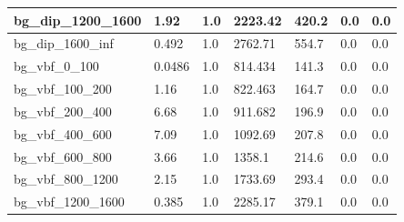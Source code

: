 \documentclass[a4paper, 10pt]{article}
\begin{document}
\begin{table}[H]
\begin{center}
\begin{tabular}{|m{23.0mm}|m{23.0mm}|m{18.0mm}|m{19.0mm}|m{19.0mm}|m{19.0mm}|m{19.0mm}|}
      \hline
      {\cellcolor{white}         bg\_dip\_1200\_1600}& {\cellcolor{white}         1.92}& {\cellcolor{white}         1.0}& {\cellcolor{white}         2223.42}& {\cellcolor{white}         420.2}& {\cellcolor{green}         0.0}& {\cellcolor{green}         0.0}\\
      \hline
      {\cellcolor{white}         bg\_dip\_1600\_inf}& {\cellcolor{white}         0.492}& {\cellcolor{white}         1.0}& {\cellcolor{white}         2762.71}& {\cellcolor{white}         554.7}& {\cellcolor{green}         0.0}& {\cellcolor{green}         0.0}\\
      \hline
      {\cellcolor{white}         bg\_vbf\_0\_100}& {\cellcolor{white}         0.0486}& {\cellcolor{white}         1.0}& {\cellcolor{white}         814.434}& {\cellcolor{white}         141.3}& {\cellcolor{green}         0.0}& {\cellcolor{green}         0.0}\\
      \hline
      {\cellcolor{white}         bg\_vbf\_100\_200}& {\cellcolor{white}         1.16}& {\cellcolor{white}         1.0}& {\cellcolor{white}         822.463}& {\cellcolor{white}         164.7}& {\cellcolor{green}         0.0}& {\cellcolor{green}         0.0}\\
      \hline
      {\cellcolor{white}         bg\_vbf\_200\_400}& {\cellcolor{white}         6.68}& {\cellcolor{white}         1.0}& {\cellcolor{white}         911.682}& {\cellcolor{white}         196.9}& {\cellcolor{green}         0.0}& {\cellcolor{green}         0.0}\\
      \hline
      {\cellcolor{white}         bg\_vbf\_400\_600}& {\cellcolor{white}         7.09}& {\cellcolor{white}         1.0}& {\cellcolor{white}         1092.69}& {\cellcolor{white}         207.8}& {\cellcolor{green}         0.0}& {\cellcolor{green}         0.0}\\
      \hline
      {\cellcolor{white}         bg\_vbf\_600\_800}& {\cellcolor{white}         3.66}& {\cellcolor{white}         1.0}& {\cellcolor{white}         1358.1}& {\cellcolor{white}         214.6}& {\cellcolor{green}         0.0}& {\cellcolor{green}         0.0}\\
      \hline
      {\cellcolor{white}         bg\_vbf\_800\_1200}& {\cellcolor{white}         2.15}& {\cellcolor{white}         1.0}& {\cellcolor{white}         1733.69}& {\cellcolor{white}         293.4}& {\cellcolor{green}         0.0}& {\cellcolor{green}         0.0}\\
      \hline
      {\cellcolor{white}         bg\_vbf\_1200\_1600}& {\cellcolor{white}         0.385}& {\cellcolor{white}         1.0}& {\cellcolor{white}         2285.17}& {\cellcolor{white}         379.1}& {\cellcolor{green}         0.0}& {\cellcolor{green}         0.0}\\

\end{tabular}
\end{center}
\end{table}
\end{document}

